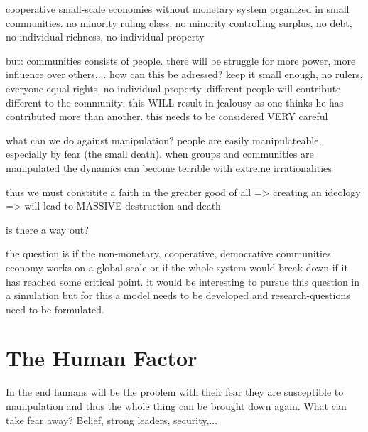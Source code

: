 \documentclass{article}
\begin{document}
cooperative small-scale economies without monetary system organized in small communities. no minority ruling class, no minority controlling surplus, no debt, no individual richness, no individual property

but: communities consists of people. there will be struggle for more power, more influence over others,... how can this be adressed? keep it small enough, no rulers, everyone equal rights, no individual property. different people will contribute different to the community: this WILL result in jealousy as one thinks he has contributed more than another. this needs to be considered VERY careful

what can we do against manipulation? people are easily manipulateable, especially by fear (the small death). when groups and communities are manipulated the dynamics can become terrible with extreme irrationalities

thus we must constitite a faith in the greater good of all => creating an ideology => will lead to MASSIVE destruction and death

is there a way out?

the question is if the non-monetary, cooperative, democrative communities economy works on a global scale or if the whole system would break down if it has reached some critical point. it would be interesting to pursue this question in a simulation but for this a model needs to be developed and research-questions need to be formulated.

\section{The Human Factor}
In the end humans will be the problem with their fear they are susceptible to manipulation and thus the whole thing can be brought down again. What can take fear away? Belief, strong leaders, security,...





\end{document}
